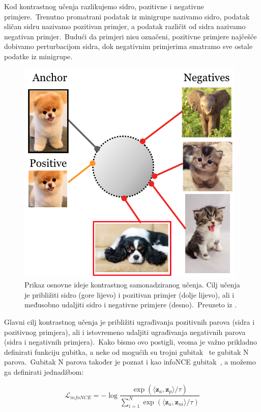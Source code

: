 \documentclass[diplomskirad]{fer}
\begin{document}
Kod kontrastnog učenja razlikujemo sidro, pozitivne i negativne primjere.\ Trenutno promatrani podatak iz minigrupe nazivamo sidro, podatak sličan sidru nazivamo pozitivan primjer, a podatak različit od sidra nazivamo negativan primjer.\ 
Budući da primjeri nisu označeni, pozitivne primjere najčešće dobivamo perturbacijom sidra, dok negativnim primjerima smatramo sve ostale podatke iz minigrupe.\ 

\begin{figure}[h]
  \centering
  \includegraphics[scale=1]{./Slike/ssl.png}
  \caption{Prikaz osnovne ideje kontrastnog samonadziranog učenja. Cilj učenja je približiti sidro (gore lijevo) i pozitivan primjer (dolje lijevo), ali i međusobno udaljiti sidro i negativne primjere (desno).\ Preuzeto iz \cite{khosla2020supervised}.}
  \label{fig:ssl}
\end{figure}

Glavni cilj kontrastnog učenja je približiti ugrađivanja pozitivnih parova (sidra i pozitivnog primjera), ali i istovremeno udaljiti ugrađivanja negativnih parova (sidra i negativnih primjera).\ 
Kako bismo ovo postigli, veoma je važno prikladno definirati funkciju gubitka, a neke od mogućih su trojni gubitak~\cite{schroff2015facenet} te gubitak N parova.\ 
Gubitak N parova također je poznat i kao infoNCE gubitak~\cite{oord2018representation}, a možemo ga definirati jednadžbom:

\begin{equation}
  \mathcal{L}_{infoNCE} = - \log{\frac{\exp(\langle \bm{z}_{a}, \bm{z}_{p} \rangle / \tau)}{\sum_{i=1}^{N}{\exp(\langle \bm{z}_{a}, \bm{z}_{ni} \rangle / \tau)}}}
  \label{eq:infoNCE}
\end{equation}
\end{document}
